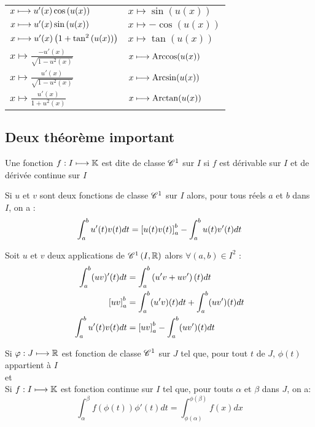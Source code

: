 \begin{defprop}
\begin{center}
\begin{tabular}{|l|l|}
            \(x\longmapsto u'(x)\cos\left(u(x)\right)\) & \(x\mapsto \sin(u(x)) \) \\
            \(x\longmapsto u'(x)\sin\left(u(x)\right)\) & \(x\mapsto -\cos(u(x)) \) \\
            \(x\longmapsto u'(x)\left(1+\tan^2\left(u(x)\right)\right)\) & \(x\mapsto \tan(u(x)) \) \\
            \hline
            \(x\mapsto \frac{-u'(x)}{\sqrt{1-u^2(x)}}\) & \(x\longmapsto \operatorname{Arccos}(u(x)) \)\\
            \(x\mapsto \frac{u'(x)}{\sqrt{1-u^2(x)}}\) & \(x\longmapsto \operatorname{Arcsin}(u(x)) \)  \\
            \(x\mapsto \frac{u'(x)}{1+u^2(x)}\) & \(x\longmapsto \operatorname{Arctan}(u(x)) \) \\
            \hline
	    \end{tabular}
    \end{center}
\end{defprop}

\subsection{Deux théorème important}
\begin{defi}[préliminaire]
    Une fonction \(f : I \longmapsto \mathbb{K}\) est dite de classe \(\mathscr{C}^{1}\) sur \(I\) si \(f\) est dérivable sur \(I\) et de dérivée continue sur \(I\)
\end{defi}

\begin{theo}
    Si \(u\) et \(v\) sont deux fonctions de classe \(\mathscr{C}^{1}\) sur \(I\) alors, pour tous réels \(a\) et \(b\) dans \(I\), on a :
    \[\int_{a}^{b}u'(t)v(t)dt = \left[u(t)v(t)\right]^b_a - \int_{a}^{b}u(t)v'(t)dt\]
\end{theo}

\begin{dem}
    Soit \(u\) et \(v\) deux applications de \(\mathscr{C}^{1}\left(I,\mathbb{R}\right)\) alors \(\forall (a,b) \in I^2\) : 
    \[
    \begin{aligned}
        \int_{a}^{b}(uv)'(t)dt &= \int_{a}^{b}\left(u'v+uv'\right)(t)dt \\
         \left[uv\right]^b_a &= \int_{a}^{b}(u'v)(t)dt + \int_{a}^{b}(uv')(t)dt \\
          \int_{a}^{b}u'(t)v(t)dt &= \left[uv\right]^b_a- \int_{a}^{b}(uv')(t)dt 
    \end{aligned}
    \]
\end{dem}
\begin{theo}
    Si \(\varphi  :J \longmapsto \mathbb{R}\) est fonction de classe \(\mathscr{C}^{1}\) sur \(J\) tel que, pour tout \(t\) de \(J\), \(\phi(t)\) appartient à \(I\) \\
    et\\
    Si \(f  :I\longmapsto \mathbb{K}\) est fonction continue sur \(I\) tel que, pour touts \(\alpha\) et \(\beta\) dans \(J\), on a: 
    \[\int_{\alpha}^{\beta} f(\phi(t))\phi'(t) dt = \int_{\phi(\alpha)}^{\phi(\beta)}f(x)dx\]
\end{theo}


